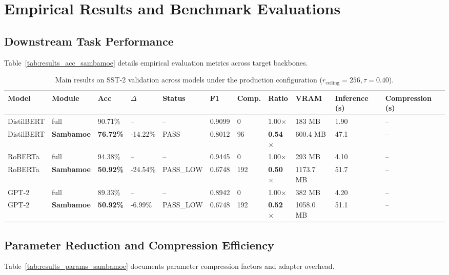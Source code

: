\section{Empirical Results and Benchmark Evaluations}

\subsection{Downstream Task Performance}
Table~\ref{tab:results_acc_sambamoe} details empirical evaluation metrics across target backbones.

\begin{table}[t]
\centering
\small
\begin{tabular}{lllllllllll}
\toprule
\textbf{Model} & \textbf{Module} & \textbf{Acc} & \textbf{$\Delta$} & \textbf{Status} & \textbf{F1} & \textbf{Comp.} & \textbf{Ratio} & \textbf{VRAM} & \textbf{Inference (s)} & \textbf{Compression (s)} \\
\midrule
DistilBERT & full & 90.71\% & -- & -- & 0.9099 & 0 & 1.00$\times$ & 183 MB & 1.90 & -- \\
DistilBERT & \textbf{Sambamoe} & \textbf{76.72\%} & -14.22\% & PASS & 0.8012 & 96 & \textbf{0.54$\times$} & 600.4 MB & 47.1 & -- \\
RoBERTa & full & 94.38\% & -- & -- & 0.9445 & 0 & 1.00$\times$ & 293 MB & 4.10 & -- \\
RoBERTa & \textbf{Sambamoe} & \textbf{50.92\%} & -24.54\% & PASS\_LOW & 0.6748 & 192 & \textbf{0.50$\times$} & 1173.7 MB & 51.7 & -- \\
GPT-2 & full & 89.33\% & -- & -- & 0.8942 & 0 & 1.00$\times$ & 382 MB & 4.20 & -- \\
GPT-2 & \textbf{Sambamoe} & \textbf{50.92\%} & -6.99\% & PASS\_LOW & 0.6748 & 192 & \textbf{0.52$\times$} & 1058.0 MB & 51.1 & -- \\
\bottomrule
\end{tabular}
\caption{Main results on SST-2 validation across models under the production configuration ($r_{\mathrm{ceiling}}=256, \tau=0.40$).}
\label{tab:main_sst2}
\end{table}

\subsection{Parameter Reduction and Compression Efficiency}
Table~\ref{tab:results_params_sambamoe} documents parameter compression factors and adapter overhead.

